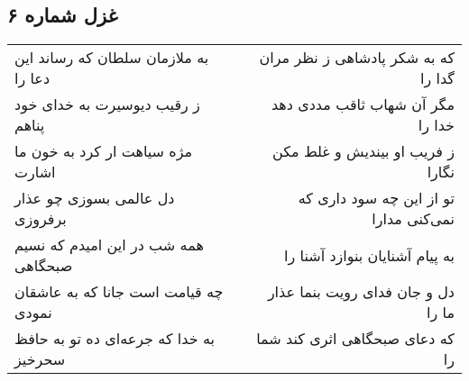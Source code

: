 \begin{center}
\section*{غزل شماره ۶}
\label{sec:sh006}
\begin{longtable}{l p{0.5cm} r}
به ملازمان سلطان که رساند این دعا را
&&
که به شکر پادشاهی ز نظر مران گدا را
\\
ز رقیب دیوسیرت به خدای خود پناهم
&&
مگر آن شهاب ثاقب مددی دهد خدا را
\\
مژه سیاهت ار کرد به خون ما اشارت
&&
ز فریب او بیندیش و غلط مکن نگارا
\\
دل عالمی بسوزی چو عذار برفروزی
&&
تو از این چه سود داری که نمی‌کنی مدارا
\\
همه شب در این امیدم که نسیم صبحگاهی
&&
به پیام آشنایان بنوازد آشنا را
\\
چه قیامت است جانا که به عاشقان نمودی
&&
دل و جان فدای رویت بنما عذار ما را
\\
به خدا که جرعه‌ای ده تو به حافظ سحرخیز
&&
که دعای صبحگاهی اثری کند شما را
\\
\end{longtable}
\end{center}
